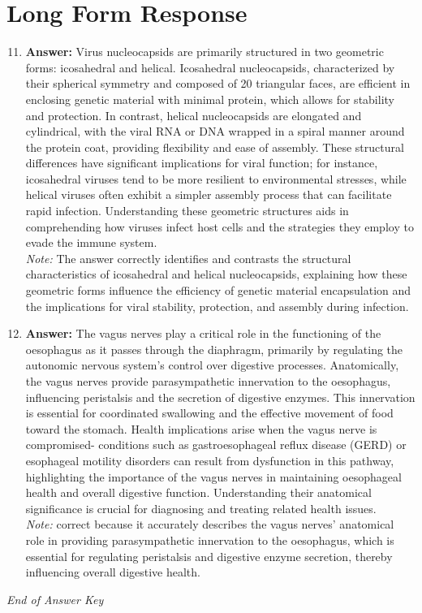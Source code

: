 \documentclass[12pt]{article}
\begin{document}
\section*{Long Form Response}
\begin{enumerate}[label=\arabic*.]
\setcounter{enumi}{10}
\item \textbf{Answer:} Virus nucleocapsids are primarily structured in two geometric forms: icosahedral and helical. Icosahedral nucleocapsids, characterized by their spherical symmetry and composed of 20 triangular faces, are efficient in enclosing genetic material with minimal protein, which allows for stability and protection. In contrast, helical nucleocapsids are elongated and cylindrical, with the viral RNA or DNA wrapped in a spiral manner around the protein coat, providing flexibility and ease of assembly. These structural differences have significant implications for viral function; for instance, icosahedral viruses tend to be more resilient to environmental stresses, while helical viruses often exhibit a simpler assembly process that can facilitate rapid infection. Understanding these geometric structures aids in comprehending how viruses infect host cells and the strategies they employ to evade the immune system.
\\ \textit{Note:} The answer correctly identifies and contrasts the structural characteristics of icosahedral and helical nucleocapsids, explaining how these geometric forms influence the efficiency of genetic material encapsulation and the implications for viral stability, protection, and assembly during infection.
\item \textbf{Answer:} The vagus nerves play a critical role in the functioning of the oesophagus as it passes through the diaphragm, primarily by regulating the autonomic nervous system's control over digestive processes. Anatomically, the vagus nerves provide parasympathetic innervation to the oesophagus, influencing peristalsis and the secretion of digestive enzymes. This innervation is essential for coordinated swallowing and the effective movement of food toward the stomach. Health implications arise when the vagus nerve is compromised- conditions such as gastroesophageal reflux disease (GERD) or esophageal motility disorders can result from dysfunction in this pathway, highlighting the importance of the vagus nerves in maintaining oesophageal health and overall digestive function. Understanding their anatomical significance is crucial for diagnosing and treating related health issues.
\\ \textit{Note:} correct because it accurately describes the vagus nerves' anatomical role in providing parasympathetic innervation to the oesophagus, which is essential for regulating peristalsis and digestive enzyme secretion, thereby influencing overall digestive health.
\end{enumerate}

\vfill
\noindent\textit{End of Answer Key}
\end{document}
